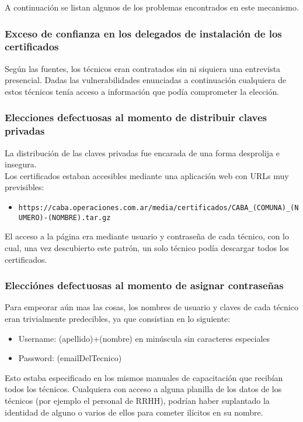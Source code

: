 A continuación se listan algunos de los problemas encontrados en este mecanismo.

\subsubsection{Exceso de confianza en los delegados de instalación de los certificados}

Según las fuentes, los técnicos eran contratados sin ni siquiera una entrevista presencial. Dadas las vulnerabilidades enunciadas a continuación cualquiera de estos técnicos tenía acceso a información que podía comprometer la elección.

\subsubsection{Elecciones defectuosas al momento de distribuir claves privadas}

La distribución de las claves privadas fue encarada de una forma desprolija e insegura.\\

Los certificados estaban accesibles mediante una aplicación web con URLs muy previsibles:\\

\begin{itemize}
	\item \texttt{https://caba.operaciones.com.ar/media/certificados/CABA\_(COMUNA)\_(NUMERO)-(NOMBRE).tar.gz}
\end{itemize}

El acceso a la página era mediante usuario y contraseña de cada técnico, con lo cual, una vez descubierto este patrón, un solo técnico podía descargar todos los certificados.

\subsubsection{Elecciónes defectuosas al momento de asignar contraseñas}
Para empeorar aún mas las cosas, los nombres de usuario y claves de cada técnico eran trivialmente predecibles, ya que consistian en lo siguiente:

\begin{itemize}
	\item Username: (apellido)+(nombre) en minúscula sin caracteres especiales
	\item Password: (emailDelTecnico)
\end{itemize}

Esto estaba especificado en los mismos manuales de capacitación que recibían todos los técnicos. Cualquiera con acceso a alguna planilla de los datos de los técnicos (por ejemplo el personal de RRHH), podrían haber suplantado la identidad de alguno o varios de ellos para cometer ilícitos en su nombre.

